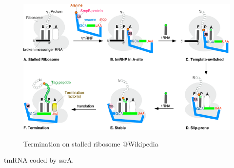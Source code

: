 \begin{figure}[hbtp]
  \centering
  \includegraphics[width=15cm]{figure/tmRNAProcess.png}\\
  \caption{Termination on stalled ribosome @Wikipedia}\label{fig:translationStalledRibosome}
\end{figure}
tmRNA coded by ssrA.


